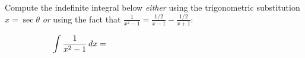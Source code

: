 Compute the indefinite integral below \emph{either} using the trigonometric substitution $x=\sec\theta$ \emph{or} using the fact that $\displaystyle \frac{1}{x^2-1} = \frac{1/2}{x-1} - \frac{1/2}{x+1}$:

\medskip
  $$\int \frac{1}{x^2-1} \,dx = \hspace{2.5in}$$